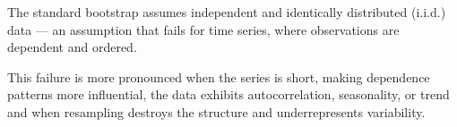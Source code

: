 \documentclass[ijoc,sglanonrev]{informs4}
\begin{document}


The standard bootstrap assumes independent and identically distributed (i.i.d.) data — an assumption that fails for time series, where observations are dependent and ordered.

This failure is more pronounced when the series is short, making dependence patterns more influential, the data exhibits autocorrelation, seasonality, or trend and when resampling destroys the structure and underrepresents variability.
\end{document}
